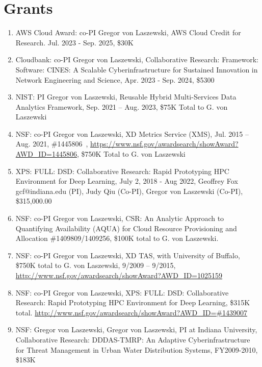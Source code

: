 \documentclass{article}
\begin{document}
\section{Grants}

\begin{enumerate}


\item AWS Cloud Award: co-PI Gregor von Laszewski, AWS Cloud Credit for Research.  Jul. 2023 - Sep. 2025, \$30K
\item Cloudbank: co-PI Gregor von Laszewski, Collaborative Research: Framework: Software: CINES: A Scalable Cyberinfrastructure for Sustained Innovation in Network Engineering and Science, Apr. 2023 - Sep. 2024, \$5300
\item NIST: PI Gregor von Laszewski, Reusable Hybrid Multi-Services Data Analytics Framework, Sep. 2021 – Aug. 2023, \$75K Total to G. von Laszewski
\item  NSF: co-PI Gregor von Laszewski, XD Metrics Service (XMS), Jul. 2015 – Aug. 2021, \#1445806 , \url{https://www.nsf.gov/awardsearch/showAward?AWD_ID=1445806}, \$750K Total to G. von Laszewski
\item  XPS: FULL: DSD: Collaborative Research: Rapid Prototyping HPC Environment for Deep Learning, July 2, 2018 - Aug 2022, Geoffrey Fox gcf@indiana.edu (PI), Judy Qiu (Co-PI), Gregor von Laszewski (Co-PI), 	\$315,000.00
\item  NSF: co-PI Gregor von Laszewski, CSR: An Analytic Approach to Quantifying Availability (AQUA) for Cloud Resource Provisioning and Allocation \#1409809/1409256, \$100K total to G. von Laszewski. 

\item  NSF: co-PI Gregor von Laszewski, XD TAS, with University of Buffalo, \$750K total to G. von Laszewski, 9/2009 – 9/2015, \url{http://www.nsf.gov/awardsearch/showAward?AWD_ID=1025159}

\item  NSF: co-PI Gregor von Laszewski, XPS: FULL: DSD: Collaborative Research: Rapid Prototyping HPC Environment for Deep Learning, \$315K total.
  \url{http://www.nsf.gov/awardsearch/showAward?AWD_ID=\#1439007}

\item  NSF: Gregor von Laszewski, Gregor von Laszewski, PI at Indiana University, Collaborative Research: DDDAS-TMRP: An Adaptive Cyberinfrastructure for Threat Management in Urban Water Distribution Systems, FY2009-2010, \$183K
  

\end{enumerate}
\end{document}
